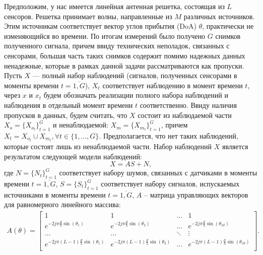 \documentclass[11pt]{article}
\begin{document}
\begin{center}
\fontsize{20}{23}\selectfont {}
\end{center}
\begin{center}
\fontsize{16}{20}\selectfont {}
\end{center}
Предположим, у нас имеется линейная антенная решетка, состоящая из $L$ сенсоров. Решетка принимает волны, направленные из $M$ различных источников. Этим источникам соответствует вектор углов прибытия (DoA) $\theta$, практически не изменяющийся во времени. По итогам измерений было получено $G$ снимков полученного сигнала, причем ввиду технических неполадок, связанных с сенсорами, большая часть таких снимков содержит помимо надежных данных ненадежные, которые в рамках данной задачи рассматриваются как пропуски. Пусть $X$ --- полный набор наблюдений (сигналов, полученных сенсорами в моменты времени $t=\overline{1,G}$), $X_t$ соответствует наблюдению в момент времени $t$, через $x$ и $x_t$ будем обозначать реализации полного набора наблюдений и наблюдения в отдельный момент времени $t$  соответственно. Ввиду наличия пропусков в данных, будем считать, что $X$ состоит из наблюдаемой части $X_o = \{X_{o_t}\}_{t=1}^G$ и ненаблюдаемой: $X_m = \{X_{m_t}\}_{t=1}^G$, причем $X_t = X_{o_t} \cup X_{m_t}, \forall t \in \{1, ..., G\}$. Предполагается, что нет таких наблюдений, которые состоят лишь из ненаблюдаемой части. Набор наблюдений $X$ является результатом следующей модели наблюдений:
\begin{equation}
X = A S + N,
\end{equation}
где $N=\{N_t\}_{t=1}^G$ соответствует набору шумов, связанных с датчиками в моменты времени $t=\overline{1,G}$, $S=\{S_t\}_{t=1}^G$ соответствует набору сигналов, испускаемых источниками в моменты времени $t=\overline{1,G}$, $A$ -- матрица управляющих векторов для равномерного линейного массива:
\begin{gather}
A(\theta) = \begin{bmatrix}
1&1&\dots&1\\
e^{-2j\pi \frac{d}{\lambda}\sin(\theta_1)}& e^{-2j\pi \frac{d}{\lambda}\sin(\theta_2)}&\dots&e^{-2j\pi \frac{d}{\lambda}\sin(\theta_M)}\\
\dots&\dots&\ddots&\vdots\\
e^{-2j\pi (L-1) \frac{d}{\lambda}\sin(\theta_1)}& e^{-2j\pi (L-1) \frac{d}{\lambda}\sin(\theta_2)}&\dots&e^{-2j\pi (L-1) \frac{d}{\lambda}\sin(\theta_M)}\\
\end{bmatrix}.
\nonumber
\end{gather}
\end{document}
